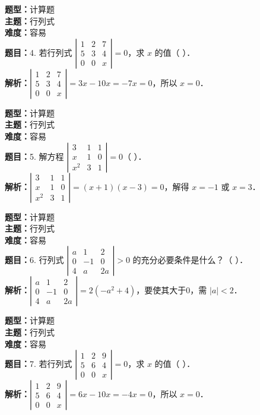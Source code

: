 \documentclass{ctexart}
\newenvironment{question}[5]{%
	\noindent\textbf{题型：}#1\\
	\textbf{主题：}#2\\
	\textbf{难度：}#3\\
	\textbf{题目：}#4\\
	\textbf{解析：}#5\\
	\vspace{1em}
}{}
\begin{document}
\begin{question} 
	{计算题} 
	{行列式}
	{容易}
	{4. 若行列式 $\left|\begin{array}{lll}1 & 2 & 7 \\ 5 & 3 & 4 \\ 0 & 0 & x\end{array}\right|=0$，求 $x$ 的值（ ）．}
	{$\left|\begin{array}{lll}1 & 2 & 7 \\ 5 & 3 & 4 \\ 0 & 0 & x\end{array}\right|=3x - 10x = -7x=0$，所以 $x=0$．}
\end{question}

\begin{question} 
	{计算题} 
	{行列式}
	{容易}
	{5. 解方程 $\left|\begin{array}{ccc}3 & 1 & 1 \\ x & 1 & 0 \\ x^2 & 3 & 1\end{array}\right|=0$（ ）．}
	{$\left|\begin{array}{ccc}3 & 1 & 1 \\ x & 1 & 0 \\ x^2 & 3 & 1\end{array}\right|=(x+1)(x-3)=0$，解得 $x=-1$ 或 $x=3$．}
\end{question}

\begin{question} 
	{计算题} 
	{行列式}
	{容易}
	{6. 行列式 $\left|\begin{array}{ccc}a & 1 & 2 \\ 0 & -1 & 0 \\ 4 & a & 2a\end{array}\right|>0$ 的充分必要条件是什么？（ ）．}
	{$\left|\begin{array}{ccc}a & 1 & 2 \\ 0 & -1 & 0 \\ 4 & a & 2a\end{array}\right|=2(-a^2+4)$，要使其大于0，需 $|a|<2$．}
\end{question}

\begin{question} 
	{计算题} 
	{行列式}
	{容易}
	{7. 若行列式 $\left|\begin{array}{lll}1 & 2 & 9 \\ 5 & 6 & 4 \\ 0 & 0 & x\end{array}\right|=0$，求 $x$ 的值（ ）．}
	{$\left|\begin{array}{lll}1 & 2 & 9 \\ 5 & 6 & 4 \\ 0 & 0 & x\end{array}\right|=6x - 10x = -4x=0$，所以 $x=0$．}
\end{question}
\end{document}
